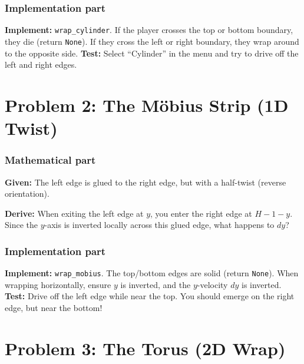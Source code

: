 \documentclass[11pt]{article}
\begin{document}
\subsubsection*{Implementation part}
\textbf{Implement:} \lstinline|wrap_cylinder|. If the player crosses the top or bottom boundary, they die (return \lstinline|None|). If they cross the left or right boundary, they wrap around to the opposite side.
\textbf{Test:} Select ``Cylinder'' in the menu and try to drive off the left and right edges.


\section*{Problem 2: The Möbius Strip (1D Twist)}

\subsubsection*{Mathematical part}
\textbf{Given:} The left edge is glued to the right edge, but with a half-twist (reverse orientation).
\begin{center}
\end{center}
\textbf{Derive:} When exiting the left edge at $y$, you enter the right edge at $H - 1 - y$. Since the $y$-axis is inverted locally across this glued edge, what happens to $dy$?

\subsubsection*{Implementation part}
\textbf{Implement:} \lstinline|wrap_mobius|. The top/bottom edges are solid (return \lstinline|None|). When wrapping horizontally, ensure $y$ is inverted, and the $y$-velocity $dy$ is inverted.
\textbf{Test:} Drive off the left edge while near the top. You should emerge on the right edge, but near the bottom!


\section*{Problem 3: The Torus (2D Wrap)}
\end{document}
